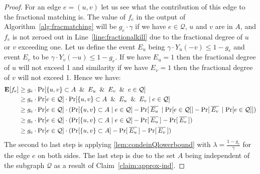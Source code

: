 \documentclass[letterpaper,11pt]{article}
\DeclareMathOperator{\E}{\ensuremath{\normalfont \textbf{E}}}
\begin{document}
\begin{proof}
For an edge $e = (u, v)$ let us see what the contribution of this edge to the fractional matching is. The value of $f_e$ in the output of Algorithm~\ref{alg:fracmatching} will be $g_e \cdot \gamma$ if we have $e \in \mathcal{Q}$, $u$ and $v$ are in $A$, and $f_e$ is not zeroed out in Line~\ref{line:fractionalkill} due to the fractional degree of $u$ or $v$ exceeding one. Let us define the event $E_u$ being $\gamma \cdot Y_u(-v) \leq 1 - g_e$ and event $E_v$ to be $\gamma \cdot Y_v(-u) \leq 1 - g_e$. If we have $E_u = 1$ then the fractional degree of $u$ will not exceed 1 and similarity if we have $E_v = 1$ then the fractional degree of $v$ will not exceed 1. Hence we have:
\newcommand{\Overline}[1]{\hspace{0.2em}\overline{#1}\hspace{0.2em}}
\begin{align}\label{eq:ExpectedFe}
    \E[f_e] & \geq g_e \cdot \Pr[\{u, v\} \subset A \And E_u \And E_v \And e \in \mathcal{Q}]
    \nonumber
    \\
    & \geq g_e \cdot \Pr[e \in \mathcal{Q}] \cdot \Pr[\{u, v\} \subset A \And E_u \And E_v \mid e \in \mathcal{Q}] 
    \nonumber
    \\
    & \geq g_e \cdot \Pr[e \in \mathcal{Q}] \cdot (\Pr[\{u, v\} \subset A \mid e \in \mathcal{Q}] - \Pr[\Overline{E_u} \mid \Pr[e \in \mathcal{Q}]] - \Pr[\Overline{E_v} \mid \Pr[e \in \mathcal{Q}]]) 
    \nonumber
    \\
    & \geq g_e \cdot \Pr[e \in \mathcal{Q}] \cdot (\Pr[\{u, v\} \subset A \mid e \in \mathcal{Q}] - \Pr[\Overline{E_u}] - \Pr[\Overline{E_v}]) 
    \nonumber
    \\
    & \geq g_e \cdot \Pr[e \in \mathcal{Q}] \cdot (\Pr[\{u, v\} \subset A] - \Pr[\Overline{E_u}] - \Pr[\Overline{E_v}])
\end{align}
The second to last step is applying \cref{lem:condeinQlowerbound} with $\lambda = \frac{1 - g_e}{\gamma}$ for the edge $e$ on both sides. The last step is due to the set $A$ being independent of the subgraph $\mathcal{Q}$ as a result of Claim~\ref{claim:approx-ind}.


\end{proof}
\end{document}

